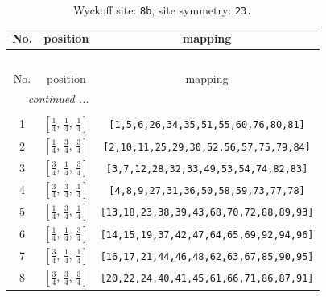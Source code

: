\documentclass[fleqn,8pt]{jsarticle}
\begin{document}
\begin{longtable}{ccc}
\caption{Wyckoff site: {\tt 8b}, site symmetry: {\tt 23.}}
 \\
 \hline \hline
No. & position & mapping \\ \hline \endfirsthead

\multicolumn{2}{l}{\tablename\ \thetable{}} \\
 \hline \hline
No. & position & mapping \\ \hline \endhead

 \hline \hline
\multicolumn{2}{r}{\footnotesize\it continued ...} \\ \endfoot

 \hline \hline
\multicolumn{2}{r}{} \\ \endlastfoot

1 & $\left[ \frac{1}{4},\, \frac{1}{4},\, \frac{1}{4} \right]$ & {\tt [1,5,6,26,34,35,51,55,60,76,80,81]} \\ \hline
2 & $\left[ \frac{1}{4},\, \frac{3}{4},\, \frac{3}{4} \right]$ & {\tt [2,10,11,25,29,30,52,56,57,75,79,84]} \\ \hline
3 & $\left[ \frac{3}{4},\, \frac{1}{4},\, \frac{3}{4} \right]$ & {\tt [3,7,12,28,32,33,49,53,54,74,82,83]} \\ \hline
4 & $\left[ \frac{3}{4},\, \frac{3}{4},\, \frac{1}{4} \right]$ & {\tt [4,8,9,27,31,36,50,58,59,73,77,78]} \\ \hline
5 & $\left[ \frac{1}{4},\, \frac{3}{4},\, \frac{1}{4} \right]$ & {\tt [13,18,23,38,39,43,68,70,72,88,89,93]} \\ \hline
6 & $\left[ \frac{1}{4},\, \frac{1}{4},\, \frac{3}{4} \right]$ & {\tt [14,15,19,37,42,47,64,65,69,92,94,96]} \\ \hline
7 & $\left[ \frac{3}{4},\, \frac{1}{4},\, \frac{1}{4} \right]$ & {\tt [16,17,21,44,46,48,62,63,67,85,90,95]} \\ \hline
8 & $\left[ \frac{3}{4},\, \frac{3}{4},\, \frac{3}{4} \right]$ & {\tt [20,22,24,40,41,45,61,66,71,86,87,91]} \\
\end{longtable}
\renewcommand{\arraystretch}{1.2}
\end{document}

